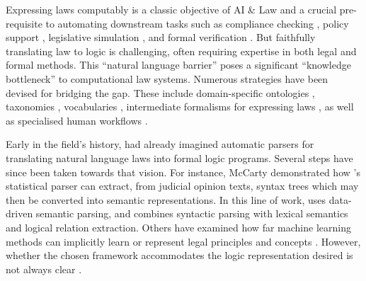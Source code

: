 \documentclass{IOS-Book-Article}
\begin{document}
Expressing laws computably is a classic objective of AI \& Law \cite{mccarty_reflections_1977, sergot_british_1986} and a crucial pre-requisite to automating downstream tasks such as
compliance checking \cite{palmirani_modelling_2018, hickey_gdpr_2021},
policy support \cite{svensson_expertisze_1992, haan_tracs_1992},
legislative simulation \cite{bench-capon_logic_1987, bench-capon_support_1992},
and formal verification \cite{haan_tracs_1992}.
But faithfully translating law to logic is challenging, often requiring expertise in both legal and formal methods. This ``natural language barrier'' \cite{mccarty_deep_2007} poses a significant ``knowledge bottleneck'' \cite{nazarenko_pragmatic_2021} to computational law systems.
Numerous strategies have been devised for bridging the gap.
These include
domain-specific ontologies \cite{palmirani_legal_2018},
taxonomies \cite{hulstijn_taxonomy_2020},
vocabularies \cite{hickey_gdpr_2021},
intermediate formalisms for expressing laws \cite{mccarty_language_1989, kralingen_norm_1993, mccarty_deep_2007},
as well as specialised human workflows \cite{palmirani_legal_2018, witt_converting_2021}.

Early in the field's history, \cite{bing_designing_1987} had already imagined automatic parsers for translating natural language laws into formal logic programs. Several steps have since been taken towards that vision.
For instance, McCarty \cite{mccarty_deep_2007} demonstrated how \cite{collins_head-driven_2003}'s statistical parser can extract, from judicial opinion texts, syntax trees which may then be converted into semantic representations.
In this line of work, \cite{ferraro2019automatic} uses data-driven semantic parsing, and \cite{dragoni2015combining} combines syntactic parsing with lexical semantics and logical relation extraction.
Others have examined how far machine learning methods can implicitly learn or represent legal principles and concepts \cite{groendijk_neural_1992, de_maat_automatic_2008, winkels_automatic_2012, chalkidis_neural_2019, chalkidis_lexglue_2022}. However,
whether the chosen framework accommodates the logic representation desired is not always clear \cite{wyner_study_2013}.
\end{document}
